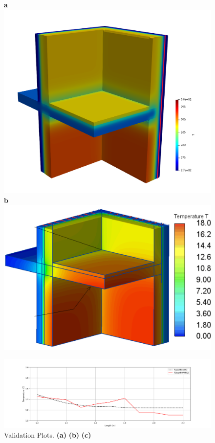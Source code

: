 \begin{figure}[tbh]
    \centering
    \textbf{a}\includegraphics[width=0.65\columnwidth]{Figures/casewoutair.png}
    \textbf{b}\includegraphics[width=0.65\columnwidth]{Figures/ValidationCaseClean.png}


    
    \includegraphics[width=1\columnwidth, clip = true]{Figures/Figure_2.png}
    \caption[3D Validation Plots]{Validation Plots. \textbf{(a)} \textbf{(b)}  \textbf{(c)} }
    \label{fig:validation-plots}
\end{figure}







